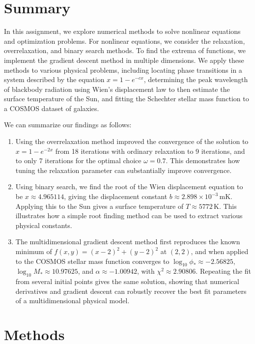 \documentclass[a4paper,11pt]{article}
\begin{document}
\section*{Summary} 

In this assignment, we explore numerical methods to solve nonlinear equations and optimization problems. For nonlinear equations, we consider the relaxation, overrelaxation, and binary search methods. To find the extrema of functions, we implement the gradient descent method in multiple dimensions. We apply these methods to various physical problems, including locating phase transitions in a system described by the equation $x = 1 - e^{-cx}$, determining the peak wavelength of blackbody radiation using Wien's displacement law to then estimate the surface temperature of the Sun, and fitting the Schechter stellar mass function to a COSMOS dataset of galaxies. 

We can summarize our findings as follows:
\begin{enumerate}
\item Using the overrelaxation method improved the convergence of the solution to $x=1-e^{-2x}$ from 18 iterations with ordinary relaxation to 9 iterations, and to only 7 iterations for the optimal choice $\omega=0.7$. This demonstrates how tuning the relaxation parameter can substantially improve convergence.
\item Using binary search, we find the root of the Wien displacement equation to be $x\approx4.965114$, giving the displacement constant $b\approx2.898\times10^{-3}\,\mathrm{mK}$. Applying this to the Sun gives a surface temperature of $T\approx5772\,\mathrm{K}$. This illustrates how a simple root finding method can be used to extract various physical constants.
\item The multidimensional gradient descent method first reproduces the known minimum of $f(x,y)=(x-2)^2+(y-2)^2$ at $(2,2)$, and when applied to the COSMOS stellar mass function converges to $\log_{10}\phi_*\approx-2.56825$, $\log_{10}M_*\approx10.97625$, and $\alpha\approx-1.00942$, with $\chi^2\approx2.90806$. Repeating the fit from several initial points gives the same solution, showing that numerical derivatives and gradient descent can robustly recover the best fit parameters of a multidimensional physical model.
\end{enumerate}

\section*{Methods}
\end{document}
